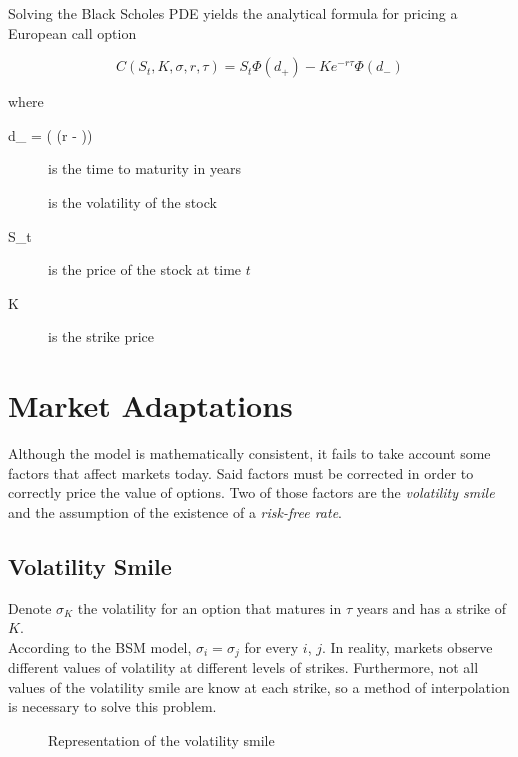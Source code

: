 \documentclass{article}
\begin{document}
Solving the Black Scholes PDE yields the analytical formula for pricing a European call option

\begin{equation}
    C(S_t,  K, \sigma, r, \tau) = S_t \Phi(d_+) - Ke^{-r\tau}\Phi(d_-)
\end{equation}

where
\begin{description}
	\item[d_{\pm} = \left(\log{} \pm (r - )\tau\right)]
    \item[\tau] is the time to maturity in years
    \item[\sigma] is the volatility of the stock
    \item[S_t] is the price of the stock at time $t$
    \item[K] is the strike price
\end{description}

\section{Market Adaptations}
Although the \citeauthor{black_scholes} model is mathematically consistent, it fails to take account some factors that affect markets today. Said factors must be corrected in order to correctly price the value of options. Two of those factors are the \textit{volatility smile} and the assumption of the existence of a \textit{risk-free rate}.

\subsection{Volatility Smile}
Denote $\sigma_K$ the volatility for an option that matures in $\tau$ years and has a strike of $K$. \\

According to the BSM model, $\sigma_i = \sigma_j$ for every $i$, $j$. In reality, markets observe different values of volatility at different levels of strikes. Furthermore, not all values of the volatility smile are know at each strike, so a method of interpolation is necessary to solve this problem.

\begin{figure}[h]
    \centering
    \caption{Representation of the volatility smile}
\end{figure}
\end{document}
